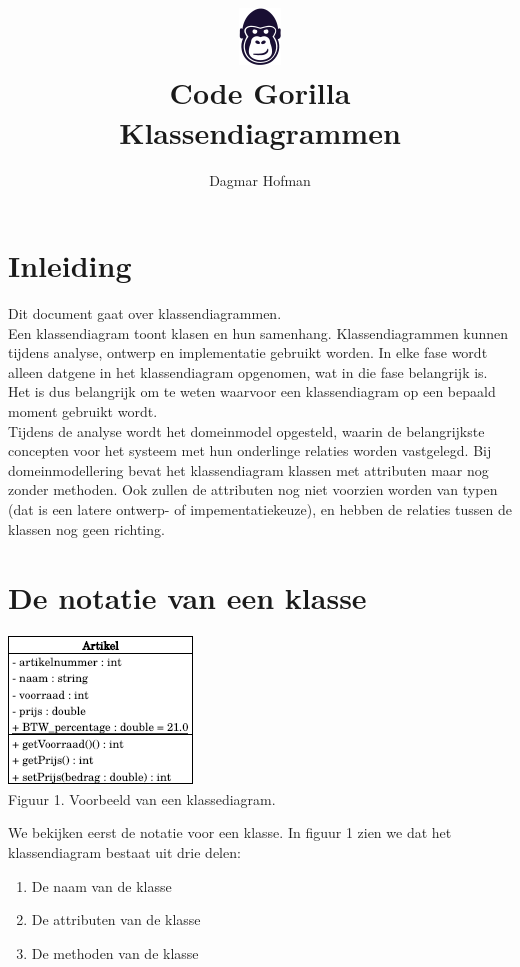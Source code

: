 \documentclass{article}
\title{ \includegraphics[scale=1]{gorilla.png} \\ Code Gorilla \\ Klassendiagrammen}
\author{Dagmar Hofman}
\date{}
\begin{document}
	\maketitle
	\newpage
	\tableofcontents
	\newpage
	\section{Inleiding}
	
	Dit document gaat over klassendiagrammen. \\
	Een klassendiagram toont klasen en hun samenhang. Klassendiagrammen kunnen tijdens analyse, ontwerp en implementatie gebruikt worden. In elke fase wordt alleen datgene in het klassendiagram opgenomen, wat in die fase belangrijk is. Het is dus belangrijk om te weten waarvoor een klassendiagram op een bepaald moment gebruikt wordt. \\
	Tijdens de analyse wordt het domeinmodel opgesteld, waarin de belangrijkste concepten voor het systeem met hun onderlinge relaties worden vastgelegd.
	Bij domeinmodellering bevat het klassendiagram klassen met attributen maar nog zonder methoden. Ook zullen de attributen nog niet voorzien worden van typen (dat is een latere ontwerp- of impementatiekeuze), en hebben de relaties tussen de klassen nog geen richting. \\
	
	\section{De notatie van een klasse}
	
	\bigskip
	
	\includegraphics[scale=1.8]{diagram1.png} \\
	Figuur 1. Voorbeeld van een klassediagram.
	
	\newpage
	
	\noindent We bekijken eerst de notatie voor een klasse. In figuur 1 zien we dat het klassendiagram bestaat uit drie delen: \\
	\begin{enumerate}
		\item De naam van de klasse
		\item De attributen van de klasse
		\item De methoden van de klasse
	\end{enumerate}
\end{document}
